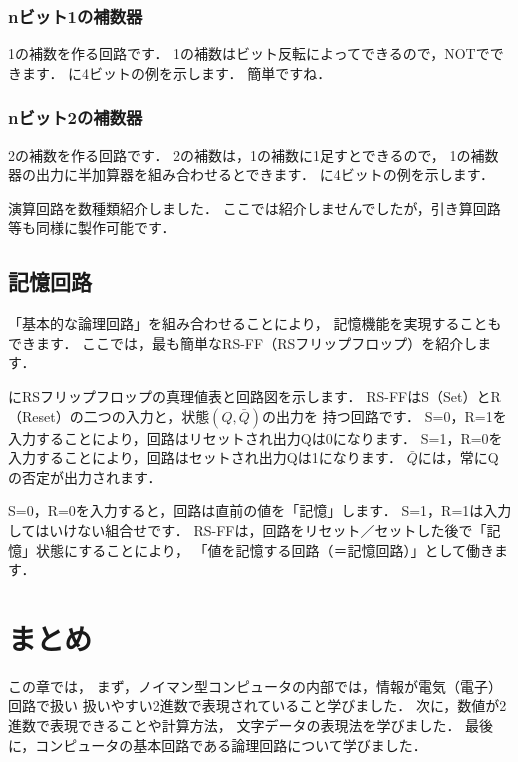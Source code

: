 
\subsubsection{nビット1の補数器}
1の補数を作る回路です．
1の補数はビット反転によってできるので，NOTでできます．
に4ビットの例を示します．
簡単ですね．


\subsubsection{nビット2の補数器}
2の補数を作る回路です．
2の補数は，1の補数に1足すとできるので，
1の補数器の出力に半加算器を組み合わせるとできます．
に4ビットの例を示します．


演算回路を数種類紹介しました．
ここでは紹介しませんでしたが，引き算回路等も同様に製作可能です．

\subsection{記憶回路}
「基本的な論理回路」を組み合わせることにより，
記憶機能を実現することもできます．
ここでは，最も簡単なRS-FF（RSフリップフロップ）を紹介します．

にRSフリップフロップの真理値表と回路図を示します．
RS-FFはS（Set）とR（Reset）の二つの入力と，状態$(Q, \bar Q)$の出力を
持つ回路です．
S=0，R=1を入力することにより，回路はリセットされ出力Qは0になります．
S=1，R=0を入力することにより，回路はセットされ出力Qは1になります．
\( \bar Q \)には，常にQの否定が出力されます．

S=0，R=0を入力すると，回路は直前の値を「記憶」します．
S=1，R=1は入力してはいけない組合せです．
RS-FFは，回路をリセット／セットした後で「記憶」状態にすることにより，
「値を記憶する回路（＝記憶回路）」として働きます．


\section{まとめ}
この章では，
まず，ノイマン型コンピュータの内部では，情報が電気（電子）回路で扱い
扱いやすい2進数で表現されていること学びました．
次に，数値が2進数で表現できることや計算方法，
文字データの表現法を学びました．
最後に，コンピュータの基本回路である論理回路について学びました．

